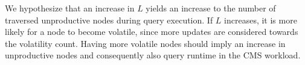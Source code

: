 \documentclass[abstracton,12pt]{scrartcl}
\theoremstyle{definition}
\begin{document}
We hypothesize that an increase in $L$ yields an increase to the number of
traversed unproductive nodes during query execution. If $L$ increases, it is
more likely for a node to become volatile, since more updates are considered
towards the volatility count.
Having more volatile nodes should imply an increase in unproductive nodes and
consequently also query runtime in the CMS workload.



\end{document}
